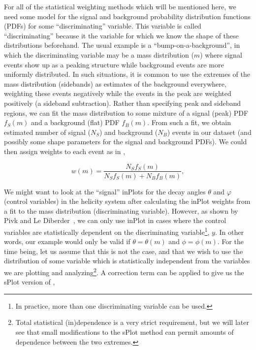 For all of the statistical weighting methods which will be mentioned here, we need some model for the signal and background probability distribution functions (PDFs) for some ``discriminating'' variable. This variable is called ``discriminating'' because it the variable for which we know the shape of these distributions beforehand. The usual example is a ``bump-on-a-background'', in which the discriminating variable may be a mass distribution ($m$) where signal events show up as a peaking structure while background events are more uniformly distributed. In such situations, it is common to use the extremes of the mass distribution (sidebands) as estimates of the background everywhere, weighting these events negatively while the events in the peak are weighted positively (a sideband subtraction). Rather than specifying peak and sideband regions, we can fit the mass distribution to some mixture of a signal (peak) PDF $f_S(m)$ and a background (flat) PDF $f_B(m)$. From such a fit, we obtain estimated number of signal ($N_S$) and background ($N_B$) events in our dataset (and possibly some shape parameters for the signal and background PDFs). We could then assign weights to each event as in ,

\begin{equation}
  w(m) = \frac{N_S f_S(m)}{N_S f_S(m) + N_B f_B(m)},
  \label{eq:inplot-weights-mass}
\end{equation}

We might want to look at the ``signal'' inPlots for the decay angles $\theta$ and $\varphi$ (control variables) in the helicity system after calculating the inPlot weights from a fit to the mass distribution (discriminating variable). However, as shown by Pivk and Le Diberder~\cite{Pivk2005}, we can only use inPlot in cases where the control variables are statistically dependent on the discriminating variable\footnote{In practice, more than one discriminating variable can be used.}, $y$. In other words, our example would only be valid if $\theta = \theta(m)$ and $\phi = \phi(m)$. For the time being, let us assume that this is not the case, and that we wish to use the distribution of some variable which is statistically independent from the variables we are plotting and analyzing\footnote{Total statistical (in)dependence is a very strict requirement, but we will later see that small modifications to the sPlot method can permit amounts of dependence between the two extremes.}. A correction term can be applied to give us the sPlot version of ,

